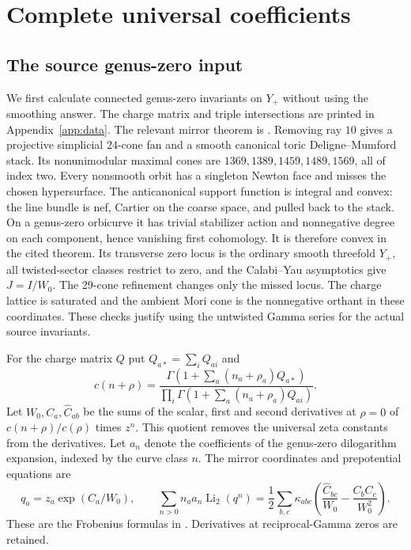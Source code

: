 \section{Complete universal coefficients}\label{sec:calculation}

\subsection{The source genus-zero input}
We first calculate connected genus-zero invariants on $Y_+$ without
using the smoothing answer. The charge matrix and triple intersections
are printed in Appendix~\ref{app:data}. The relevant mirror theorem
is \cite[Theorem 25 and Corollary 28]{CCIT}. Removing ray $10$
gives a projective simplicial 24-cone fan and a smooth canonical
toric Deligne--Mumford stack. Its nonunimodular maximal cones are
$1369,1389,1459,1489,1569$, all of index two. Every nonsmooth
orbit has a singleton Newton face and misses the chosen hypersurface.
The anticanonical support function is integral and convex: the line
bundle is nef, Cartier on the coarse space, and pulled back to the
stack. On a genus-zero orbicurve it has trivial stabilizer action and
nonnegative degree on each component, hence vanishing first cohomology.
It is therefore convex in the cited theorem. Its transverse zero
locus is the ordinary smooth threefold $Y_+$, all twisted-sector
classes restrict to zero, and the Calabi--Yau asymptotics give
$J=I/W_0$. The 29-cone refinement changes only the missed locus.
The charge lattice is saturated and the ambient Mori cone is the
nonnegative orthant in these coordinates. These checks justify
using the untwisted Gamma series for the actual source invariants.

For the charge matrix $Q$ put $Q_{a*}=\sum_iQ_{ai}$ and
\[
 c(n+\rho)=\frac{\Gamma(1+\sum_a(n_a+\rho_a)Q_{a*})}
 {\prod_i\Gamma(1+\sum_a(n_a+\rho_a)Q_{ai})}.
\]
Let $W_0,C_a,\widehat C_{ab}$ be the sums of the scalar, first and
second derivatives at $\rho=0$ of $c(n+\rho)/c(\rho)$ times $z^n$.
This quotient removes the universal zeta constants from the derivatives.
Let $a_n$ denote the coefficients of the genus-zero dilogarithm
expansion, indexed by the curve class $n$.
The mirror coordinates and prepotential equations are
\begin{equation}\label{eq:mirror}
 q_a=z_a\exp(C_a/W_0),\qquad
 \sum_{n>0}n_a a_n\operatorname{Li}_2(q^n)
 =\frac12\sum_{b,c}\kappa_{abc}
 \left(\frac{\widehat C_{bc}}{W_0}-\frac{C_bC_c}{W_0^2}\right).
\end{equation}
These are the Frobenius formulas in \cite[Section 4.4 and Appendix A]{DMM}.
Derivatives at reciprocal-Gamma zeros are retained.

